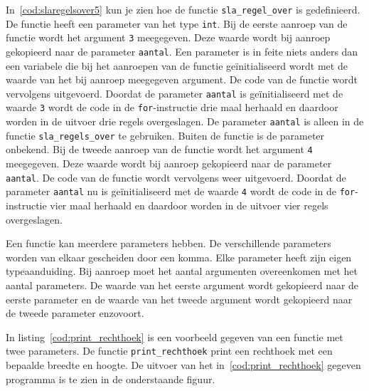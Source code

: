 In~\ref{cod:slaregelsover5} kun je zien hoe de functie \texttt{sla\_regel\_over} is gedefinieerd.
De functie heeft een parameter van het type \texttt{int}.
Bij de eerste aanroep van de functie wordt het argument \texttt{3} meegegeven.
Deze waarde wordt bij aanroep gekopieerd naar de parameter \texttt{aantal}.
Een parameter is in feite niets anders dan een variabele die bij het aanroepen van de functie geïnitialiseerd wordt met de waarde van het bij aanroep meegegeven argument.
De code van de functie wordt vervolgens uitgevoerd.
Doordat de parameter \texttt{aantal} is geïnitialiseerd met de waarde \texttt{3} wordt de code in de \texttt{for}-instructie drie maal herhaald en daardoor worden in de uitvoer drie regels overgeslagen.
De parameter \texttt{aantal} is alleen in de functie \texttt{sla\_regels\_over} te gebruiken.
Buiten de functie is de parameter onbekend.  
Bij de tweede aanroep van de functie wordt het argument \texttt{4} meegegeven.
Deze waarde wordt bij aanroep gekopieerd naar de parameter \texttt{aantal}.
De code van de functie wordt vervolgens weer uitgevoerd.
Doordat de parameter \texttt{aantal} nu is geïnitialiseerd met de waarde \texttt{4} wordt de code in de \texttt{for}-instructie vier maal herhaald en daardoor worden in de uitvoer vier regels overgeslagen.



Een functie kan meerdere parameters hebben. 
De verschillende parameters worden van elkaar gescheiden door een komma.
Elke parameter heeft zijn eigen typeaanduiding.
Bij aanroep moet het aantal argumenten overeenkomen met het aantal parameters.
De waarde van het eerste argument wordt gekopieerd naar de eerste parameter en de waarde van het tweede argument wordt gekopieerd naar de tweede parameter enzovoort.



In listing~\ref{cod:print_rechthoek} is een voorbeeld gegeven van een functie met twee parameters.
De functie \texttt{print\_rechthoek} print een rechthoek met een bepaalde breedte en hoogte.
De uitvoer van het in~\ref{cod:print_rechthoek} gegeven programma is te zien in de onderstaande figuur.

